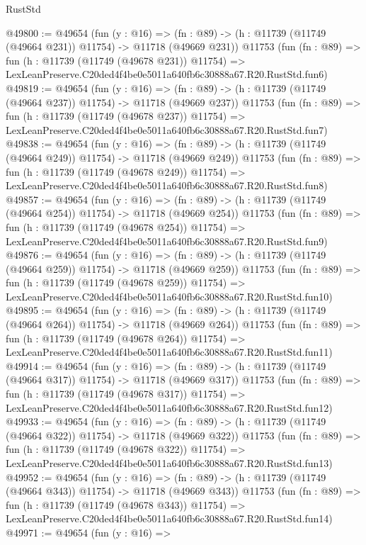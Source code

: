 \begin{lexlean}{RustStd}
\begin{coremodule}
@49800 := @49654
    (fun (y : @16) =>
    (fn : @89) -> (h : @11739 (@11749 (@49664 @231)) @11754) -> @11718 (@49669 @231))
    @11753
    (fun (fn : @89) =>
    fun (h : @11739 (@11749 (@49678 @231)) @11754) =>
    LexLeanPreserve.C20ded4f4be0e5011a640fb6c30888a67.R20.RustStd.fun6)
@49819 := @49654
    (fun (y : @16) =>
    (fn : @89) -> (h : @11739 (@11749 (@49664 @237)) @11754) -> @11718 (@49669 @237))
    @11753
    (fun (fn : @89) =>
    fun (h : @11739 (@11749 (@49678 @237)) @11754) =>
    LexLeanPreserve.C20ded4f4be0e5011a640fb6c30888a67.R20.RustStd.fun7)
@49838 := @49654
    (fun (y : @16) =>
    (fn : @89) -> (h : @11739 (@11749 (@49664 @249)) @11754) -> @11718 (@49669 @249))
    @11753
    (fun (fn : @89) =>
    fun (h : @11739 (@11749 (@49678 @249)) @11754) =>
    LexLeanPreserve.C20ded4f4be0e5011a640fb6c30888a67.R20.RustStd.fun8)
@49857 := @49654
    (fun (y : @16) =>
    (fn : @89) -> (h : @11739 (@11749 (@49664 @254)) @11754) -> @11718 (@49669 @254))
    @11753
    (fun (fn : @89) =>
    fun (h : @11739 (@11749 (@49678 @254)) @11754) =>
    LexLeanPreserve.C20ded4f4be0e5011a640fb6c30888a67.R20.RustStd.fun9)
@49876 := @49654
    (fun (y : @16) =>
    (fn : @89) -> (h : @11739 (@11749 (@49664 @259)) @11754) -> @11718 (@49669 @259))
    @11753
    (fun (fn : @89) =>
    fun (h : @11739 (@11749 (@49678 @259)) @11754) =>
    LexLeanPreserve.C20ded4f4be0e5011a640fb6c30888a67.R20.RustStd.fun10)
@49895 := @49654
    (fun (y : @16) =>
    (fn : @89) -> (h : @11739 (@11749 (@49664 @264)) @11754) -> @11718 (@49669 @264))
    @11753
    (fun (fn : @89) =>
    fun (h : @11739 (@11749 (@49678 @264)) @11754) =>
    LexLeanPreserve.C20ded4f4be0e5011a640fb6c30888a67.R20.RustStd.fun11)
@49914 := @49654
    (fun (y : @16) =>
    (fn : @89) -> (h : @11739 (@11749 (@49664 @317)) @11754) -> @11718 (@49669 @317))
    @11753
    (fun (fn : @89) =>
    fun (h : @11739 (@11749 (@49678 @317)) @11754) =>
    LexLeanPreserve.C20ded4f4be0e5011a640fb6c30888a67.R20.RustStd.fun12)
@49933 := @49654
    (fun (y : @16) =>
    (fn : @89) -> (h : @11739 (@11749 (@49664 @322)) @11754) -> @11718 (@49669 @322))
    @11753
    (fun (fn : @89) =>
    fun (h : @11739 (@11749 (@49678 @322)) @11754) =>
    LexLeanPreserve.C20ded4f4be0e5011a640fb6c30888a67.R20.RustStd.fun13)
@49952 := @49654
    (fun (y : @16) =>
    (fn : @89) -> (h : @11739 (@11749 (@49664 @343)) @11754) -> @11718 (@49669 @343))
    @11753
    (fun (fn : @89) =>
    fun (h : @11739 (@11749 (@49678 @343)) @11754) =>
    LexLeanPreserve.C20ded4f4be0e5011a640fb6c30888a67.R20.RustStd.fun14)
@49971 := @49654
    (fun (y : @16) =>

\end{coremodule}
\end{lexlean}
